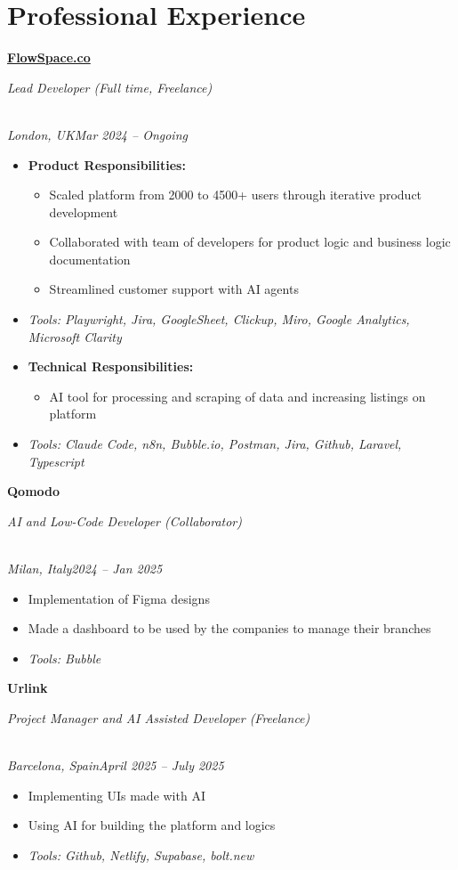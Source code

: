 \documentclass[a4paper,10pt]{article}
\newcommand{\role}[4]{\vspace{3pt}\noindent\hspace{0.6em}\parbox[t]{0.38\textwidth}{\raggedright\textbf{#1}}\hfill\parbox[t]{0.58\textwidth}{\raggedleft\textit{#2}}\\{\textit{#3}\hfill\textit{#4}}\vspace{1pt}}
\begin{document}
\section{Professional Experience}
\role{\href{https://flowspace.co}{FlowSpace.co}}{Lead Developer (Full time, Freelance)}{London, UK}{Mar 2024 -- Ongoing}
\begin{itemize}
\item \textbf{Product Responsibilities:}
\begin{itemize}[label=--]
\item Scaled platform from 2000 to 4500+ users through iterative product development
\item Collaborated with team of developers for product logic and business logic documentation
\item Streamlined customer support with AI agents
\end{itemize}
\item \textit{Tools: Playwright, Jira, GoogleSheet, Clickup, Miro, Google Analytics, Microsoft Clarity}
\item \textbf{Technical Responsibilities:}
\begin{itemize}[label=--]
\item AI tool for processing and scraping of data and increasing listings on platform
\end{itemize}
\item \textit{Tools: Claude Code, n8n, Bubble.io, Postman, Jira, Github, Laravel, Typescript}
\end{itemize}

\role{Qomodo}{AI and Low-Code Developer (Collaborator)}{Milan, Italy}{2024 -- Jan 2025}
\begin{itemize}
\item Implementation of Figma designs
\item Made a dashboard to be used by the companies to manage their branches
\item \textit{Tools: Bubble}
\end{itemize}

\role{Urlink}{Project Manager and AI Assisted Developer (Freelance)}{Barcelona, Spain}{April 2025 -- July 2025}
\begin{itemize}
\item Implementing UIs made with AI
\item Using AI for building the platform and logics
\item \textit{Tools: Github, Netlify, Supabase, bolt.new}
\end{itemize}
\end{document}
